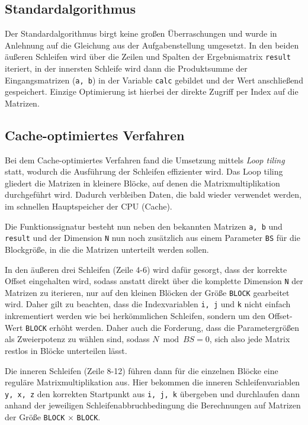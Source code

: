 \documentclass[a4paper,11pt]{scrartcl}
\begin{document}
\subsection{Standardalgorithmus}
Der Standardalgorithmus birgt keine großen Überraschungen und wurde in Anlehnung auf die 
Gleichung aus der Aufgabenstellung umgesetzt. In den beiden äußeren Schleifen 
wird über die Zeilen und Spalten der Ergebnismatrix \texttt{result} iteriert,
in der innersten Schleife wird dann die Produktsumme der Eingangsmatrizen (\texttt{a, b}) in der
Variable \texttt{calc} gebildet und der Wert anschließend gespeichert.
Einzige Optimierung ist hierbei der direkte Zugriff per Index auf die Matrizen.



\subsection{Cache-optimiertes Verfahren}
Bei dem Cache-optimiertes Verfahren fand die Umsetzung mittels \emph{Loop tiling} statt,
wodurch die Ausführung der Schleifen effizienter wird. Das Loop tiling gliedert die 
Matrizen in kleinere Blöcke, auf denen die Matrixmultiplikation durchgeführt wird.
Dadurch verbleiben Daten, die bald wieder verwendet werden, im schnellen Hauptspeicher der 
CPU (Cache). \newpage



Die Funktionssignatur besteht nun neben den bekannten Matrizen \texttt{a, b} und \texttt{result}
und der Dimension \texttt{N} nun noch zusätzlich aus einem Parameter \texttt{BS} für 
die Blockgröße, in die die Matrizen unterteilt werden sollen.\newline

In den äußeren drei Schleifen (Zeile 4-6) wird dafür gesorgt, dass der korrekte Offset eingehalten wird,
sodass anstatt direkt über die komplette Dimension \texttt{N} der Matrizen zu iterieren, nur auf den
kleinen Blöcken der Größe \texttt{BLOCK} gearbeitet wird. Daher gilt zu beachten, dass die Indexvariablen
\texttt{i,~j} und \texttt{k} nicht einfach inkrementiert werden wie bei herkömmlichen Schleifen,
sondern um den Offset-Wert \texttt{BLOCK} erhöht werden. Daher auch die Forderung, dass 
die Parametergrößen als Zweierpotenz zu wählen sind, sodass $N \bmod BS = 0$, sich also jede 
Matrix restlos in Blöcke unterteilen lässt.\newline

Die inneren Schleifen (Zeile 8-12) führen dann für die einzelnen Blöcke eine reguläre 
Matrixmultiplikation aus. Hier bekommen die inneren Schleifenvariablen \texttt{y, x, z} den korrekten 
Startpunkt aus \texttt{i, j, k} übergeben und durchlaufen dann anhand der jeweiligen 
Schleifenabbruchbedingung die Berechnungen auf Matrizen der Größe \texttt{BLOCK} $\times$ \texttt{BLOCK}.
\end{document}
